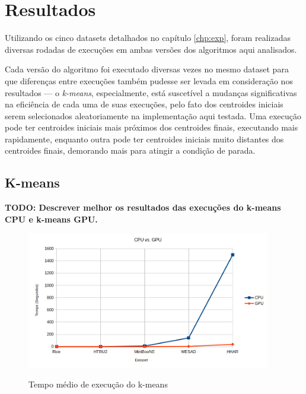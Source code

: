 \documentclass[12pt,
openright, 
oneside, %
a4paper,    %
brazil]{facom-ufu-abntex2}
\begin{document}

\chapter{Resultados}
\label{chp:resultados}

Utilizando os cinco datasets detalhados no capítulo \ref{chp:exp}, foram realizadas diversas rodadas de execuções em ambas versões dos algoritmos aqui analisados.

Cada versão do algoritmo foi executado diversas vezes no mesmo dataset para que diferenças entre execuções também pudesse ser levada em consideração nos resultados — o \textit{k-means}, especialmente, está suscetível a mudanças significativas na eficiência de cada uma de suas execuções, pelo fato dos centroides iniciais serem selecionados aleatoriamente na implementação aqui testada. Uma execução pode ter centroides iniciais mais próximos dos centroides finais, executando mais rapidamente, enquanto outra pode ter centroides iniciais muito distantes dos centroides finais, demorando mais para atingir a condição de parada.




\section{K-means}
\label{sec:testesDeSpeedup}

\textbf{TODO: Descrever melhor os resultados das execuções do k-means CPU e k-means GPU.}


\begin{figure}[h]
  \caption{Tempo médio de execução do k-means}
  \centering
  \includegraphics[width=0.95\textwidth]{kMeansAvgTime.png}
  \label{fig:kMeansAvgTime}
\end{figure}
\end{document}
